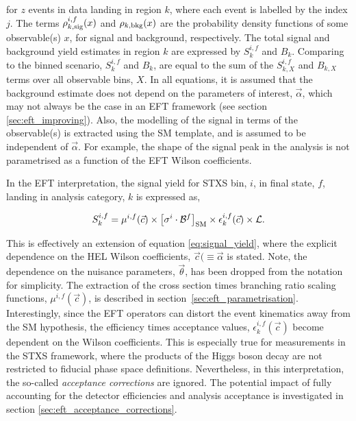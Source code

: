 \noindent
for $z$ events in data landing in region $k$, where each event is labelled by the index $j$. The terms $\rho^{i,f}_{k,{\rm{sig}}}(x)$ and $\rho_{k,{\rm{bkg}}}(x)$ are the probability density functions of some observable(s) $x$, for signal and background, respectively. The total signal and background yield estimates in region $k$ are expressed by $S^{i,f}_{k}$ and $B_{k}$. Comparing to the binned scenario, $S^{i,f}_{k}$ and $B_{k}$, are equal to the sum of the $S^{i,f}_{k,X}$ and $B_{k,X}$ terms over all observable bins, $X$. In all equations, it is assumed that the background estimate does not depend on the parameters of interest, $\vec{\alpha}$, which may not always be the case in an EFT framework (see section \ref{sec:eft_improving}). Also, the modelling of the signal in terms of the observable(s) is extracted using the SM template, and is assumed to be independent of $\vec{\alpha}$. For example, the shape of the signal \mgg peak in the \Hgg analysis is not parametrised as a function of the EFT Wilson coefficients.

In the EFT interpretation, the signal yield for STXS bin, $i$, in final state, $f$, landing in analysis category, $k$ is expressed as, 

\begin{equation}
    S_k^{i,f} = \mu^{i,f}(\vec{c}) \times \big[\sigma^i \cdot \mathcal{B}^{f} \big]_{\rm{SM}} \times \epsilon^{i,f}_k(\vec{c}) \times \mathcal{L}.
\end{equation}

\noindent
This is effectively an extension of equation \ref{eq:signal_yield}, where the explicit dependence on the HEL Wilson coefficients, $\vec{c}(\equiv\vec{\alpha}$ is stated. Note, the dependence on the nuisance parameters, $\vec{\theta}$, has been dropped from the notation for simplicity. The extraction of the cross section times branching ratio scaling functions, $\mu^{i,f}(\vec{c})$, is described in section~\ref{sec:eft_parametrisation}. Interestingly, since the EFT operators can distort the event kinematics away from the SM hypothesis, the efficiency times acceptance values, $\epsilon^{i,f}_k(\vec{c})$ become dependent on the Wilson coefficients. This is especially true for measurements in the STXS framework, where the products of the Higgs boson decay are not restricted to fiducial phase space definitions. Nevertheless, in this interpretation, the so-called \textit{acceptance corrections} are ignored. The potential impact of fully accounting for the detector efficiencies and analysis acceptance is investigated in section \ref{sec:eft_acceptance_corrections}.

